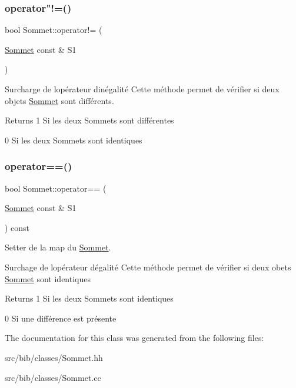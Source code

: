 \subsubsection{\texorpdfstring{operator"!=()}{operator!=()}}
{\footnotesize\ttfamily bool Sommet\+::operator!= (\begin{DoxyParamCaption}\item[{\hyperlink{classSommet}{Sommet} const \&}]{S1 }\end{DoxyParamCaption})}



Surcharge de l\textquotesingle{}op\'{e}rateur d\textquotesingle{}in\'{e}galit\'{e} Cette m\'{e}thode permet de v\'{e}rifier si deux objets \hyperlink{classSommet}{Sommet} sont diff\'{e}rents. 

\begin{DoxyReturn}{Returns}
1 Si les deux Sommets sont diff\'{e}rentes 

0 Si les deux Sommets sont identiques 
\end{DoxyReturn}
\mbox{\label{classSommet_a08f26935338b5904256eb6bee274ac1a}} 
\subsubsection{\texorpdfstring{operator==()}{operator==()}}
{\footnotesize\ttfamily bool Sommet\+::operator== (\begin{DoxyParamCaption}\item[{\hyperlink{classSommet}{Sommet} const \&}]{S1 }\end{DoxyParamCaption}) const}



Setter de la map du \hyperlink{classSommet}{Sommet}. 

Surchage de l\textquotesingle{}op\'{e}rateur d\textquotesingle{}\'{e}galit\'{e} Cette m\'{e}thode permet de v\'{e}rifier si deux obets \hyperlink{classSommet}{Sommet} sont identiques \begin{DoxyReturn}{Returns}
1 Si les deux Sommets sont identiques 

0 Si une diff\'{e}rence est pr\'{e}sente 
\end{DoxyReturn}


The documentation for this class was generated from the following files\+:\begin{DoxyCompactItemize}
\item 
src/bib/classes/Sommet.\+hh\item 
src/bib/classes/Sommet.\+cc\end{DoxyCompactItemize}
